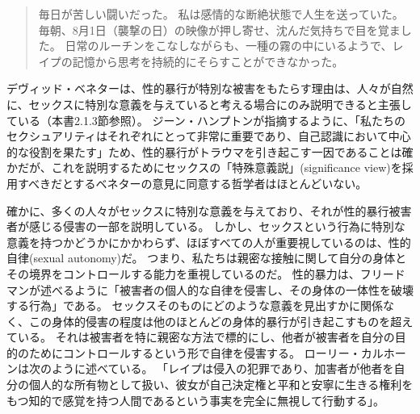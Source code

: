 \documentclass[paper=a4,book,openany]{jlreq}
\newcommand{\ig}[1]{}           %
\begin{document}
\begin{quote}
毎日が苦しい闘いだった。
私は感情的な断絶状態で人生を送っていた。
毎朝、8月1日（襲撃の日）の映像が押し寄せ、沈んだ気持ちで目を覚ました。
日常のルーチンをこなしながらも、一種の霧の中にいるようで、レイプの記憶から思考を持続的にそらすことができなかった。
\citep{freedman14:_one_hour_paris}
\end{quote}

デヴィッド・ベネターは、性的暴行が特別な被害をもたらす理由は、人々が自然に、セックスに特別な意義を与えていると考える場合にのみ説明できると主張している（本書2.1.3節参照）。
ジーン・ハンプトン\ig{Jean Hampton}が指摘するように、「私たちのセクシュアリティはそれぞれにとって非常に重要であり、自己認識において中心的な役割を果たす」ため、性的暴行がトラウマを引き起こす一因であることは確かだが、これを説明するためにセックスの「特殊意義説」(significance view)を採用すべきだとするベネター\ig{Benatar}の意見に同意する哲学者はほとんどいない\citep[p.151]{hampton99:_defin_wrong_and_defin_rape}。

確かに、多くの人々がセックスに特別な意義を与えており、それが性的暴行被害者が感じる侵害の一部を説明している。
しかし、セックスという行為に特別な意義を持つかどうかにかかわらず、ほぼすべての人が重要視しているのは、性的自律(sexual autonomy)だ。
つまり、私たちは親密な接触に関して自分の身体とその境界をコントロールする能力を重視しているのだ。
性的暴力は、フリードマン\ig{Karyn L. Freedman}が述べるように「被害者の個人的な自律を侵害し、その身体の一体性を破壊する行為」である。
セックスそのものにどのような意義を見出すかに関係なく、この身体的侵害の程度は他のほとんどの身体的暴行が引き起こすものを超えている。
それは被害者を特に親密な方法で標的にし、他者が被害者を自分の目的のためにコントロールするという形で自律を侵害する。
ローリー・カルホーンは次のように述べている。
「レイプは侵入の犯罪であり、加害者が他者を自分の個人的な所有物として扱い、彼女が自己決定権と平和と安寧に生きる権利をもつ知的で感覚を持つ人間であるという事実を完全に無視して行動する」\citep[p.109]{calhoun97:_rape}。
\end{document}
